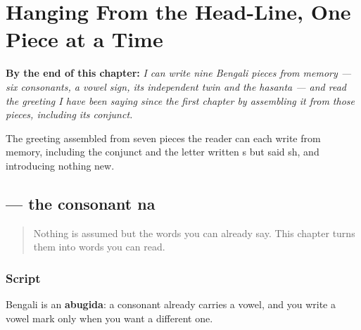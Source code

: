 
\chapter{Hanging From the Head-Line, One Piece at a Time}
\label{ch:bn-script-first}

\begin{chapteropening}
\textbf{By the end of this chapter:} \emph{I can write nine Bengali pieces from memory — six consonants, a vowel sign, its independent twin and the hasanta — and read the greeting I have been saying since the first chapter by assembling it from those pieces, including its conjunct.}

The greeting assembled from seven pieces the reader can each write from memory, including the conjunct and the letter written s but said sh, and introducing nothing new.
\end{chapteropening}

\section[\texorpdfstring{\bn{ন} (nô)}{ন (nô)}]{ — the consonant na}

\label{lesson:BN-W01-na}



\begin{quote}
Nothing is assumed but the words you can already say. This chapter turns them into words you can read.
\end{quote}

\subsection*{Script}

Bengali is an \textbf{abugida}: a consonant already carries a vowel, and you write a vowel mark only when you want a different one.

\begin{quote}
\end{quote}

